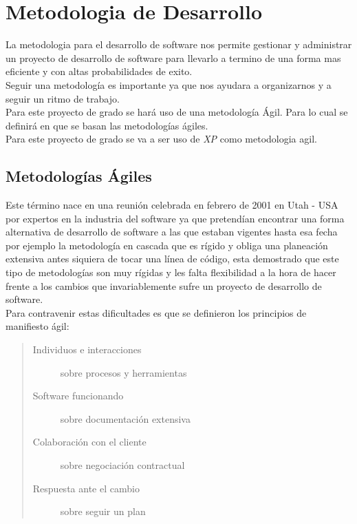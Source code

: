   \section{Metodologia de Desarrollo}
  \label{sec:metodologia_de_desarrollo}
    La metodologia para el desarrollo de software nos permite gestionar y administrar un proyecto de desarrollo de software para llevarlo a termino de una forma mas eficiente y con altas probabilidades de exito.\\
    Seguir una metodología es importante ya que nos ayudara a organizarnos y a seguir un ritmo de trabajo.\\
    Para este proyecto de grado se hará uso de una metodología Ágil. Para lo cual se definirá en que se basan las metodologías ágiles.\\

    Para este proyecto de grado se va a ser uso de \emph{XP} como metodologia agil.\\

    \subsection{Metodologías \'Agiles}
    \label{sub:metodologias_agiles}

    Este término nace en una reunión celebrada en febrero de 2001 en Utah - USA por expertos en la industria del software ya que pretendían encontrar una forma alternativa de desarrollo de software a las que estaban vigentes hasta esa fecha por ejemplo la metodología en cascada que es rígido y obliga una planeación extensiva antes siquiera de tocar una línea de código, esta demostrado que este tipo de metodologías son muy rígidas y les falta flexibilidad a la hora de hacer frente a los cambios que invariablemente sufre un proyecto de desarrollo de software.\\



    Para contravenir estas dificultades es que se definieron los principios de manifiesto ágil:

    \begin{quote}
      \begin{description}
        \item[Individuos e interacciones] sobre procesos y herramientas
        \item[Software funcionando] sobre documentación extensiva
        \item[Colaboración con el cliente] sobre negociación contractual
        \item[Respuesta ante el cambio] sobre seguir un plan
      \end{description}
    \end{quote}

